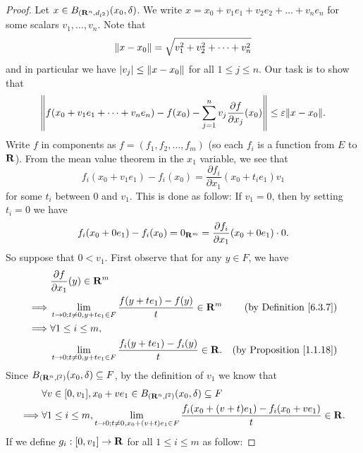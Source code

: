 \begin{proof}
    Let \(x \in B_{(\R^n, d_{l^2})}(x_0, \delta)\).
    We write \(x = x_0 + v_1 e_1 + v_2 e_2 + \dots + v_n e_n\) for some scalars \(v_1, \dots, v_n\).
    Note that
    \[
        \norm*{x - x_0} = \sqrt{v_1^2 + v_2^2 + \dots + v_n^2}
    \]
    and in particular we have \(\abs{v_j} \leq \norm*{x - x_0}\) for all \(1 \leq j \leq n\).
    Our task is to show that
    \[
        \norm*{f(x_0 + v_1 e_1 + \dots + v_n e_n) - f(x_0) - \sum_{j = 1}^n v_j \frac{\partial f}{\partial x_j}(x_0)} \leq \varepsilon \norm*{x - x_0}.
    \]
    Write \(f\) in components as \(f = (f_1 , f_2, \dots, f_m)\)
    (so each \(f_i\) is a function from \(E\) to \(\R\)).
    From the mean value theorem in the \(x_1\) variable, we see that
    \[
        f_i(x_0 + v_1 e_1) - f_i(x_0) = \frac{\partial f_i}{\partial x_1}(x_0 + t_i e_1) v_1
    \]
    for some \(t_i\) between \(0\) and \(v_1\).
    This is done as follow:
    If \(v_1 = 0\), then by setting \(t_i = 0\) we have
    \[
        f_i(x_0 + 0 e_1) - f_i(x_0) = 0_{\R^m} = \frac{\partial f_i}{\partial x_1}(x_0 + 0 e_1) \cdot 0.
    \]
    So suppose that \(0 < v_1\).
    First observe that for any \(y \in F\), we have
    \begin{align*}
                 & \frac{\partial f}{\partial x_1}(y) \in \R^m                                                                                 \\
        \implies & \lim_{t \to 0 ; t \neq 0, y + t e_1 \in F} \frac{f(y + t e_1) - f(y)}{t} \in \R^m    & \text{(by Definition \ref{6.3.7})}   \\
        \implies & \forall 1 \leq i \leq m,                                                                                                    \\
                 & \lim_{t \to 0 ; t \neq 0, y + t e_1 \in F} \frac{f_i(y + t e_1) - f_i(y)}{t} \in \R. & \text{(by Proposition \ref{1.1.18})}
    \end{align*}
    Since \(B_{(\R^n, l^2)}(x_0, \delta) \subseteq F\), by the definition of \(v_1\) we know that
    \begin{align*}
                 & \forall v \in [0, v_1], x_0 + v e_1 \in B_{(\R^n, l^2)}(x_0, \delta) \subseteq F                                                        \\
        \implies & \forall 1 \leq i \leq m, \lim_{t \to 0 ; t \neq 0, x_0 + (v + t) e_1 \in F} \frac{f_i(x_0 + (v + t) e_1) - f_i(x_0 + v e_1)}{t} \in \R.
    \end{align*}
    If we define \(g_i : [0, v_1] \to \R\) for all \(1 \leq i \leq m\) as follow:

\end{proof}
